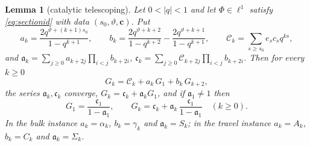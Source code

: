 \documentclass[11pt]{article}
\theoremstyle{plain}
\newtheorem{lemma}[theorem]{Lemma}
\theoremstyle{definition}
\theoremstyle{remark}
\begin{document}
\begin{lemma}[catalytic telescoping]\label{lem:tel}
Let $0<|q|<1$ and let $\Phi\in\ell^1$ satisfy \eqref{eq:sectionid} with data
$(s_0,\vartheta,\mathbf c)$. Put
\[
  a_k=\frac{2q^{\vartheta+(k+1)s_0}}{1-q^{k+1}},\qquad
  b_k=\frac{2q^{\vartheta+k+2}}{1-q^{k+2}}-\frac{2q^{\vartheta+k+1}}{1-q^{k+1}},\qquad
  \mathcal C_k=\sum_{s\ge s_0}e_sc_sq^{ks},
\]
and $\mathfrak a_k=\sum_{j\ge0}a_{k+2j}\prod_{i<j}b_{k+2i}$,
$\mathfrak c_k=\sum_{j\ge0}\mathcal C_{k+2j}\prod_{i<j}b_{k+2i}$. Then for every $k\ge0$
\begin{equation}\label{eq:threeterm}
   G_k=\mathcal C_k+a_k\,G_1+b_k\,G_{k+2},
\end{equation}
the series $\mathfrak a_k,\mathfrak c_k$ converge, $G_k=\mathfrak c_k+\mathfrak a_kG_1$, and if
$\mathfrak a_1\ne1$ then
\begin{equation}\label{eq:solved}
   G_1=\frac{\mathfrak c_1}{1-\mathfrak a_1},\qquad
   G_k=\mathfrak c_k+\mathfrak a_k\,\frac{\mathfrak c_1}{1-\mathfrak a_1}\quad(k\ge0).
\end{equation}
In the bulk instance $a_k=\alpha_k$, $b_k=\gamma_k$ and $\mathfrak a_k=S_k$; in the travel
instance $a_k=A_k$, $b_k=C_k$ and $\mathfrak a_k=\Sigma_k$.
\end{lemma}
\end{document}
